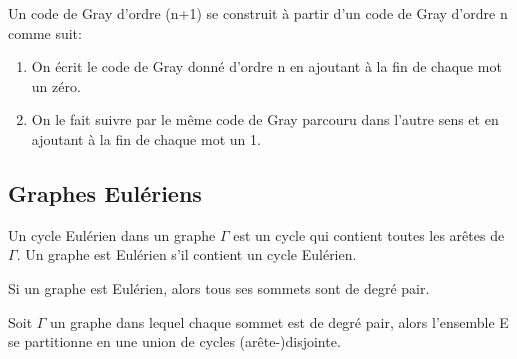 \begin{figure}[!tbph]
  \centering
  \begin{minipage}[b]{0.4\textwidth}
    
  \end{minipage}
  \hfill
  \begin{minipage}[b]{0.4\textwidth}
    
  \end{minipage}
\end{figure}

Un code de Gray d'ordre (n+1) se construit à partir d'un code de Gray d'ordre n comme suit:

\begin{enumerate}
	\item On écrit le code de Gray donné d'ordre n en ajoutant à la fin de chaque mot un zéro.
	\item On le fait suivre par le même code de Gray parcouru dans l'autre sens et en ajoutant à la fin de chaque mot un 1.
\end{enumerate}


\subsection{Graphes Eulériens}

\begin{defn}
Un cycle Eulérien dans un graphe $\Gamma$ est un cycle qui contient toutes les arêtes de $\Gamma$.
Un graphe est Eulérien s'il contient un cycle Eulérien.
\end{defn}

\begin{prop}
Si un graphe est Eulérien, alors tous ses sommets sont de degré pair.
\end{prop}

\begin{lemme}
Soit $\Gamma$ un graphe dans lequel chaque sommet est de degré pair, alors l'ensemble E se partitionne en une union de cycles (arête-)disjointe.
\end{lemme}

\begin{exmp}

\end{exmp}


\newpage

